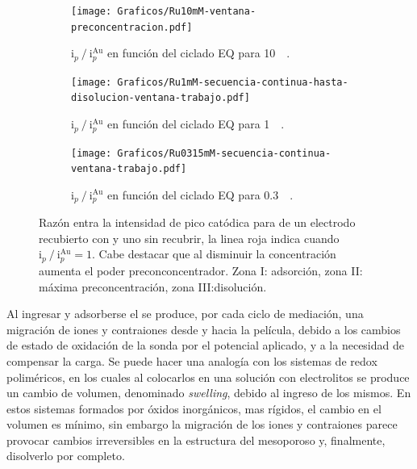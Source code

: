 		 	\begin{figure}[th]
	 	   	    \begin{subfigure}[t]{0.325\textwidth}
		        	\texttt{[image: Graficos/Ru10mM-ventana-preconcentracion.pdf]}
		       		\caption{$\text{i}_p\mathbin{/}\text{i}_p^{\text{Au}}$ en función del ciclado EQ para \ru\space \SI{10}{\milli\Molar}.}
		         	\label{fig:Ventana_Ru10mM}
		     		\end{subfigure}
	     		\begin{subfigure}[t]{0.327\textwidth}
		        	\texttt{[image: Graficos/Ru1mM-secuencia-continua-hasta-disolucion-ventana-trabajo.pdf]}
		       		\caption{$\text{i}_p\mathbin{/}\text{i}_p^{\text{Au}}$ en función del ciclado EQ para \ru\space \SI{1}{\milli\Molar}.}
		         	\label{fig:Ventana_Ru1mM}
		     		\end{subfigure}
	     		\begin{subfigure}[t]{0.325\textwidth}
		        	\texttt{[image: Graficos/Ru0315mM-secuencia-continua-ventana-trabajo.pdf]}
		       		\caption{$\text{i}_p\mathbin{/}\text{i}_p^{\text{Au}}$ en función del ciclado EQ para \ru\space \SI{0.3}{\milli\Molar}.}
		         	\label{fig:Ventana_Ru0315mM}
		     		\end{subfigure}
	 	   	   	\caption[Intensidad en función del ciclado EQ para \pdmF]{Razón entra la intensidad de pico catódica para \ru\space de un electrodo recubierto con \pdm\space y uno sin recubrir, la linea roja indica cuando $\text{i}_p\mathbin{/}\text{i}_p^{\text{Au}} = 1$. Cabe destacar que al disminuir la concentración aumenta el poder preconconcentrador. Zona I: adsorción, zona II: máxima preconcentración, zona III:disolución.}
	     		\label{fig:ventanas}
	     	  \end{figure}


		Al ingresar y adsorberse el \ru\space se produce, por cada ciclo de mediación, una migración de iones y contraiones desde y hacia la película, debido a los cambios de estado de oxidación de la sonda por el potencial aplicado, y a la necesidad de compensar la carga.  Se puede hacer una analogía con los sistemas de redox poliméricos, en los cuales al colocarlos en una solución con electrolitos se produce un cambio de volumen, denominado \textit{swelling}, debido al ingreso de los mismos\cite{Ybarra2005}. En estos sistemas formados por óxidos inorgánicos, mas rígidos, el cambio en el volumen es mínimo,\cite{Malfatti2009} sin embargo la migración de los iones y contraiones parece provocar cambios irreversibles en la estructura del mesoporoso y, finalmente, disolverlo por completo.

